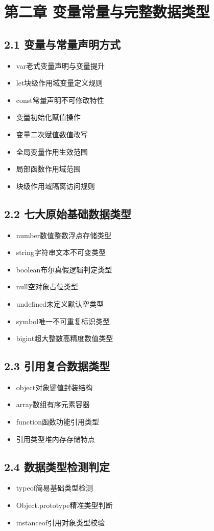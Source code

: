 \section{第二章 变量常量与完整数据类型}
\subsection{2.1 变量与常量声明方式}
\begin{itemize}
\item var老式变量声明与变量提升
\item let块级作用域变量定义规则
\item const常量声明不可修改特性
\item 变量初始化赋值操作
\item 变量二次赋值数值改写
\item 全局变量作用生效范围
\item 局部函数作用域范围
\item 块级作用域隔离访问规则
\end{itemize}

\subsection{2.2 七大原始基础数据类型}
\begin{itemize}
\item number数值整数浮点存储类型
\item string字符串文本不可变类型
\item boolean布尔真假逻辑判定类型
\item null空对象占位类型
\item undefined未定义默认空类型
\item symbol唯一不可重复标识类型
\item bigint超大整数高精度数值类型
\end{itemize}

\subsection{2.3 引用复合数据类型}
\begin{itemize}
\item object对象键值封装结构
\item array数组有序元素容器
\item function函数功能引用类型
\item 引用类型堆内存存储特点
\end{itemize}

\subsection{2.4 数据类型检测判定}
\begin{itemize}
\item typeof简易基础类型检测
\item Object.prototype精准类型判断
\item instanceof引用对象类型校验
\end{itemize}

